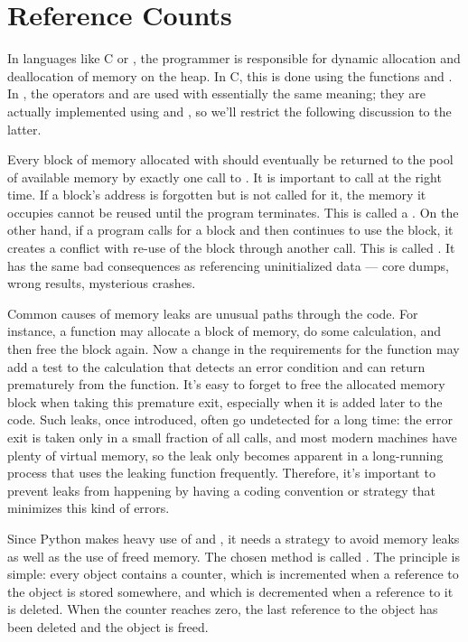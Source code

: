 \section{Reference Counts
         \label{refcounts}}

In languages like C or \Cpp, the programmer is responsible for
dynamic allocation and deallocation of memory on the heap.  In C,
this is done using the functions  and
.  In \Cpp, the operators  and
 are used with essentially the same meaning; they are
actually implemented using  and
, so we'll restrict the following discussion to the
latter.

Every block of memory allocated with  should
eventually be returned to the pool of available memory by exactly one
call to .  It is important to call
 at the right time.  If a block's address is
forgotten but  is not called for it, the memory it
occupies cannot be reused until the program terminates.  This is
called a .  On the other hand, if a program calls
 for a block and then continues to use the block, it
creates a conflict with re-use of the block through another
 call.  This is called .
It has the same bad consequences as referencing uninitialized data ---
core dumps, wrong results, mysterious crashes.

Common causes of memory leaks are unusual paths through the code.  For
instance, a function may allocate a block of memory, do some
calculation, and then free the block again.  Now a change in the
requirements for the function may add a test to the calculation that
detects an error condition and can return prematurely from the
function.  It's easy to forget to free the allocated memory block when
taking this premature exit, especially when it is added later to the
code.  Such leaks, once introduced, often go undetected for a long
time: the error exit is taken only in a small fraction of all calls,
and most modern machines have plenty of virtual memory, so the leak
only becomes apparent in a long-running process that uses the leaking
function frequently.  Therefore, it's important to prevent leaks from
happening by having a coding convention or strategy that minimizes
this kind of errors.

Since Python makes heavy use of  and
, it needs a strategy to avoid memory leaks as well
as the use of freed memory.  The chosen method is called
.  The principle is simple: every object
contains a counter, which is incremented when a reference to the
object is stored somewhere, and which is decremented when a reference
to it is deleted.  When the counter reaches zero, the last reference
to the object has been deleted and the object is freed.

